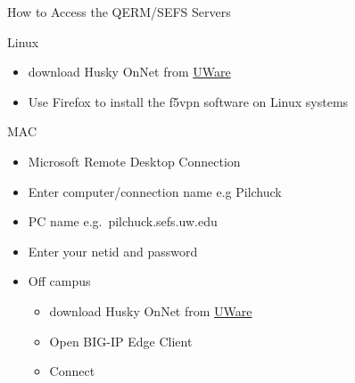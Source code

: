 \documentclass[ignorenonframetext,]{beamer}
\providecommand{\tightlist}{%
  \setlength{\itemsep}{0pt}\setlength{\parskip}{0pt}}
\begin{document}
\begin{frame}{How to Access the QERM/SEFS Servers}
\begin{block}{Linux}
\begin{itemize}[<+->]
  \begin{itemize}[<+->]
  \tightlist
  \item
    download Husky OnNet from
    \href{https://itconnect.uw.edu/connect/uw-networks/about-husky-onnet/use-husky-onnet/terms-conditions/}{UWare}
  \item
    Use Firefox to install the f5vpn software on Linux systems
  \end{itemize}
\end{itemize}

\end{block}

\begin{block}{MAC}

\begin{itemize}[<+->]
\item
  Microsoft Remote Desktop Connection
\item
  Enter computer/connection name e.g Pilchuck
\item
  PC name e.g.~pilchuck.sefs.uw.edu
\item
  Enter your netid and password
\item
  Off campus

  \begin{itemize}[<+->]
  \tightlist
  \item
    download Husky OnNet from
    \href{https://itconnect.uw.edu/connect/uw-networks/about-husky-onnet/use-husky-onnet/terms-conditions/}{UWare}
  \item
    Open BIG-IP Edge Client
  \item
    Connect
  \end{itemize}
\end{itemize}

\end{block}

\end{frame}
\end{document}

